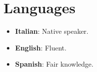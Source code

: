 \documentclass[10pt,a4paper]{article}
\begin{document}
\section{Languages}

\begin{itemize}
    \item \textbf{Italian}: Native speaker.
    \item \textbf{English}: Fluent.
    \item \textbf{Spanish}: Fair knowledge.
\end{itemize}
\end{document}
